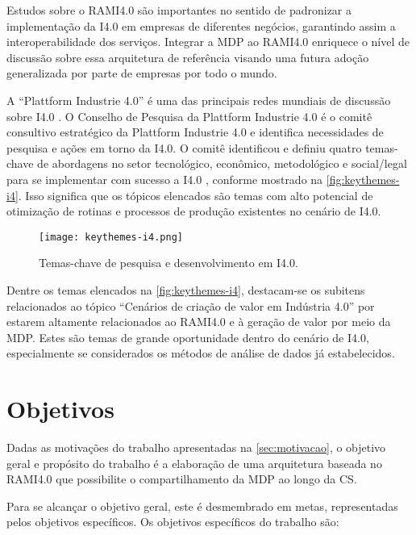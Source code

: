 Estudos sobre o RAMI4.0 são importantes no sentido de padronizar a implementação da I4.0 em empresas de diferentes negócios, garantindo assim a interoperabilidade dos serviços. Integrar a MDP ao RAMI4.0 enriquece o nível de discussão sobre essa arquitetura de referência visando uma futura adoção generalizada por parte de empresas por todo o mundo.

A ``Plattform Industrie 4.0'' é uma das principais redes mundiais de discussão sobre I4.0 \cite{kagermann2013recommendations, acatech2014plattform, hartmut2019plattform}. O Conselho de Pesquisa da Plattform Industrie 4.0 é o comitê consultivo estratégico da Plattform Industrie 4.0 e identifica necessidades de pesquisa e ações em torno da I4.0. O comitê identificou e definiu quatro temas-chave de abordagens no setor tecnológico, econômico, metodológico e social/legal para se implementar com sucesso a I4.0 \cite{hirsch-kreinsen2019keythemes}, conforme mostrado na \autoref{fig:keythemes-i4}. Isso significa que os tópicos elencados são temas com alto potencial de otimização de rotinas e processos de produção existentes no cenário de I4.0.

\begin{figure}[t]
	\centering
	\texttt{[image: keythemes-i4.png]}
	\caption{Temas-chave de pesquisa e desenvolvimento em I4.0.}
	\label{fig:keythemes-i4}
\end{figure}

Dentre os temas elencados na \autoref{fig:keythemes-i4}, destacam-se os subitens relacionados ao tópico ``Cenários de criação de valor em Indústria 4.0'' por estarem altamente relacionados ao RAMI4.0 e à geração de valor por meio da MDP. Estes são temas de grande oportunidade dentro do cenário de I4.0, especialmente se considerados os métodos de análise de dados já estabelecidos.

\section{Objetivos}
\label{sec:objetivos}

Dadas as motivações do trabalho apresentadas na \autoref{sec:motivacao}, o objetivo geral e propósito do trabalho é a elaboração de uma arquitetura baseada no RAMI4.0 que possibilite o compartilhamento da MDP ao longo da CS.

Para se alcançar o objetivo geral, este é desmembrado em metas, representadas pelos objetivos específicos. Os objetivos específicos do trabalho são:

